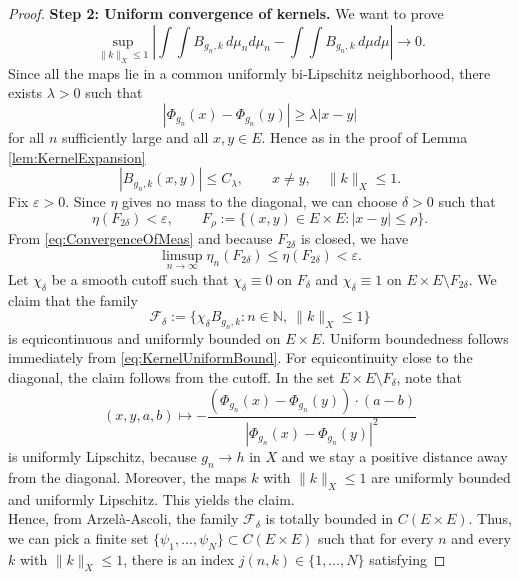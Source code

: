 \documentclass[10pt,a4paper]{amsart}
\newcommand{\eps}{\varepsilon}
\begin{document}
\begin{proof}
    \textbf{Step 2: Uniform convergence of kernels.} We want to prove
    \begin{equation}
        \label{eq:KernelConv}
        \sup_{\|k\|_X\leq 1}
        \left|
            \int\int B_{g_n,k}\,d\mu_n d\mu_n
            -
            \int\int B_{g_n,k}\,d\mu d\mu
        \right|
        \to 0.
    \end{equation}
    Since all the maps lie in a common uniformly bi-Lipschitz neighborhood, there exists $\lambda>0$ such that
    \[
        |\Phi_{g_n}(x)-\Phi_{g_n}(y)|\geq \lambda |x-y|
    \]
    for all $n$ sufficiently large and all $x,y\in E$. Hence as in the proof of Lemma \ref{lem:KernelExpansion}
    \begin{equation}
        \label{eq:KernelUniformBound}
        |B_{g_n,k}(x,y)|
        \leq C_\lambda,
        \qquad x\neq y,\quad \|k\|_X\leq 1.
    \end{equation}
    Fix $\eps>0$. Since $\eta$ gives no mass to the diagonal, we can choose $\delta>0$ such that
    \begin{equation*}
        \eta(F_{2\delta})<\eps,
        \qquad
        F_\rho:=\{(x,y)\in E\times E: |x-y|\leq \rho\}.
    \end{equation*}
    From \eqref{eq:ConvergenceOfMeas} and because $F_{2\delta}$ is closed, we have
    \begin{equation}
        \label{eq:LimSupSmall}
        \limsup_{n\to\infty}\eta_n(F_{2\delta})
        \leq \eta(F_{2\delta})
        <\eps.
    \end{equation}
    Let $\chi_\delta$ be a smooth cutoff such that $\chi_\delta\equiv 0$ on $F_\delta$ and $\chi_\delta\equiv 1$ on $E\times E\setminus F_{2\delta}$. We claim that the family
    \[
        \mathcal F_\delta
        :=
        \{\chi_\delta B_{g_n,k}: n\in\mathbb N,\ \|k\|_X\leq 1\}
    \]
    is equicontinuous and uniformly bounded on $E\times E$. Uniform boundedness follows immediately from \eqref{eq:KernelUniformBound}. For equicontinuity close to the diagonal, the claim follows from the cutoff. In the set $E\times E\setminus F_\delta$, note that
    \[
        (x,y,a,b)\mapsto
        -\frac{(\Phi_{g_n}(x)-\Phi_{g_n}(y))\cdot(a-b)}
        {|\Phi_{g_n}(x)-\Phi_{g_n}(y)|^2}
    \]
    is uniformly Lipschitz, because $g_n\to h$ in $X$ and we stay a positive distance away from the diagonal. Moreover, the maps $k$ with $\|k\|_X\leq 1$ are uniformly bounded and uniformly Lipschitz. This yields the claim.\\
    Hence, from Arzelà-Ascoli, the family $\mathcal F_\delta$ is totally bounded in $C(E\times E)$. Thus, we can pick a finite set $\{\psi_1,\ldots,\psi_N\}\subset C(E\times E)$ such that for every $n$ and every $k$ with $\|k\|_X\leq 1$, there is an index $j(n,k)\in\{1,\ldots,N\}$ satisfying

\end{proof}
\end{document}
